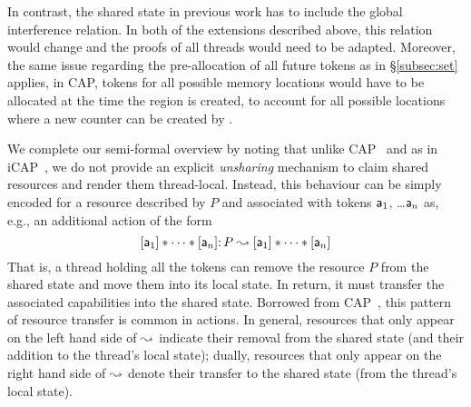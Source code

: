 In contrast, the shared state in previous work has to include the
global interference relation. In both of the extensions described
above, this relation would change and the proofs of all threads would
need to be adapted. Moreover, the same issue regarding the
pre-allocation of all future tokens as in \S\ref{subsec:set} applies,
in CAP, tokens for all possible memory locations would have to be
allocated at the time the region is created, to account for all
possible locations where a new counter can be created by .

We complete our semi-formal overview by noting that unlike
CAP~\cite{cap-ecoop10} and as in iCAP~\cite{icap}, we do not provide
an explicit \emph{unsharing} mechanism to claim shared resources and
render them thread-local. Instead, this behaviour can be simply
encoded for a resource described by $P$ and associated with tokens
$\mathsf{a}_1$, \ldots $\mathsf{a}_{n}$ as, e.g., an additional action
of the form
\[
[\mathsf{a}_1] * \cdots * [\mathsf{a}_{n}]{:}\, P \mathrel{\leadsto} [\mathsf{a}_1] * \cdots * [\mathsf{a}_{n}]
\]
That is, a thread holding all the tokens can remove the resource $P$
from the shared state and move them into its local state. In return,
it must transfer the associated capabilities into the shared
state. Borrowed from CAP~\cite{cap-ecoop10}, this pattern of resource
transfer is common in \colosl actions. In general, resources that only
appear on the left hand side of $\mathrel{\leadsto}$ indicate their removal from
the shared state (and their addition to the thread's local state);
dually, resources that only appear on the right hand side of $\mathrel{\leadsto}$
denote their transfer to the shared state (from the thread's local
state).


